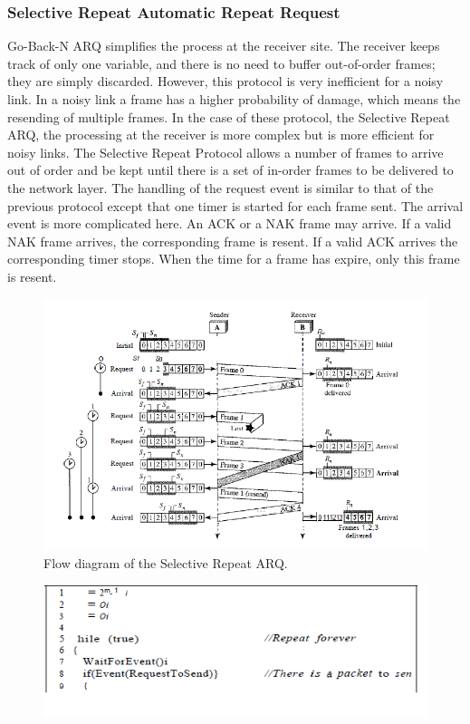 \subsubsection{Selective Repeat Automatic Repeat Request}
Go-Back-N ARQ simplifies the process at the receiver site. The receiver keeps track of
only one variable, and there is no need to buffer out-of-order frames; they are simply
discarded. However, this protocol is very inefficient for a noisy link. In a noisy link a
frame has a higher probability of damage, which means the resending of multiple frames. In the case of these protocol, the Selective Repeat ARQ, the processing at the receiver is more complex but is more efficient for noisy links. The Selective Repeat Protocol allows a number of frames to arrive out of order and be kept until there is a set of in-order frames to be
delivered to the network layer. The handling of the request event is similar to that of the previous protocol except
that one timer is started for each frame sent. The arrival event is more complicated here. An ACK
or a NAK frame may arrive. If a valid NAK frame arrives, the corresponding frame is resent. If a valid ACK arrives the corresponding timer stops. When the time for a frame has expire, only this frame is resent.
\begin{figure}[H]
\begin{center}
\includegraphics[scale=0.8]{flowselective.PNG}  
\caption{Flow diagram of the Selective Repeat ARQ.}
\end{center}
\end{figure}
\begin{figure}[H]
\begin{center}
\includegraphics[scale=0.8]{senderselective1.PNG}
\end{center} 
\end{figure}
